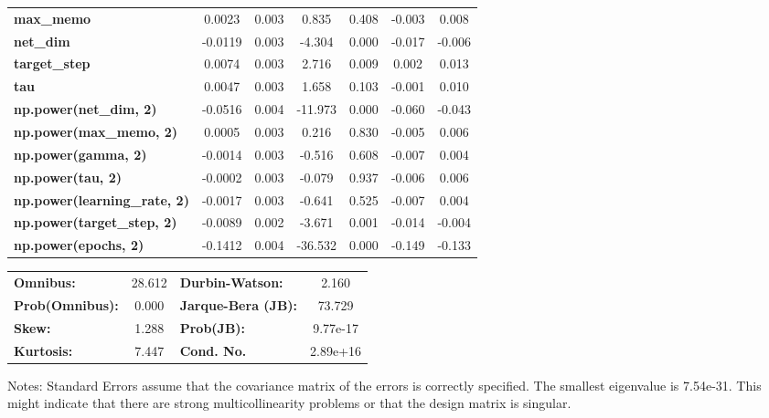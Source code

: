 \begin{center}
\begin{tabular}{lcccccc}
\textbf{max\_memo}                   &       0.0023  &        0.003     &     0.835  &         0.408        &       -0.003    &        0.008     \\
\textbf{net\_dim}                    &      -0.0119  &        0.003     &    -4.304  &         0.000        &       -0.017    &       -0.006     \\
\textbf{target\_step}                &       0.0074  &        0.003     &     2.716  &         0.009        &        0.002    &        0.013     \\
\textbf{tau}                         &       0.0047  &        0.003     &     1.658  &         0.103        &       -0.001    &        0.010     \\
\textbf{np.power(net\_dim, 2)}       &      -0.0516  &        0.004     &   -11.973  &         0.000        &       -0.060    &       -0.043     \\
\textbf{np.power(max\_memo, 2)}      &       0.0005  &        0.003     &     0.216  &         0.830        &       -0.005    &        0.006     \\
\textbf{np.power(gamma, 2)}          &      -0.0014  &        0.003     &    -0.516  &         0.608        &       -0.007    &        0.004     \\
\textbf{np.power(tau, 2)}            &      -0.0002  &        0.003     &    -0.079  &         0.937        &       -0.006    &        0.006     \\
\textbf{np.power(learning\_rate, 2)} &      -0.0017  &        0.003     &    -0.641  &         0.525        &       -0.007    &        0.004     \\
\textbf{np.power(target\_step, 2)}   &      -0.0089  &        0.002     &    -3.671  &         0.001        &       -0.014    &       -0.004     \\
\textbf{np.power(epochs, 2)}         &      -0.1412  &        0.004     &   -36.532  &         0.000        &       -0.149    &       -0.133     \\
\bottomrule
\end{tabular}
\begin{tabular}{lclc}
\textbf{Omnibus:}       & 28.612 & \textbf{  Durbin-Watson:     } &    2.160  \\
\textbf{Prob(Omnibus):} &  0.000 & \textbf{  Jarque-Bera (JB):  } &   73.729  \\
\textbf{Skew:}          &  1.288 & \textbf{  Prob(JB):          } & 9.77e-17  \\
\textbf{Kurtosis:}      &  7.447 & \textbf{  Cond. No.          } & 2.89e+16  \\
\bottomrule
\end{tabular}
\end{center}

Notes: \newline
 [1] Standard Errors assume that the covariance matrix of the errors is correctly specified. \newline
 [2] The smallest eigenvalue is 7.54e-31. This might indicate that there are \newline
 strong multicollinearity problems or that the design matrix is singular.